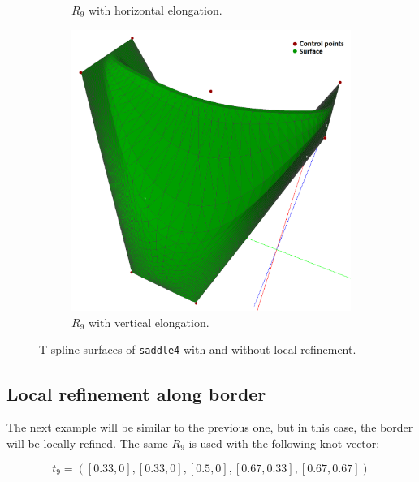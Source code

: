 \documentclass{article}
\begin{document}
\begin{figure}[H]
\begin{subfigure}[b]{0.32\textwidth}
\caption{$R_9$ with horizontal elongation.}
\label{saddle4b}
\end{subfigure}
\begin{subfigure}[b]{0.32\textwidth}
\includegraphics[width=\textwidth]{saddle4c}
\caption{$R_9$ with vertical elongation.}
\label{saddle4c}
\end{subfigure}
\caption{T-spline surfaces of \texttt{saddle4} with and without local refinement.}
\label{saddle4}
\end{figure}

\subsection{Local refinement along border}

\vspace{6pt}

The next example will be similar to the previous one, but in this case, the border will be locally refined. The same $R_9$ is used with the following knot vector:

\begin{equation}
t_{9} = ([0.33, 0], [0.33, 0], [0.5, 0], [0.67, 0.33], [0.67, 0.67])
\end{equation}
\end{document}
